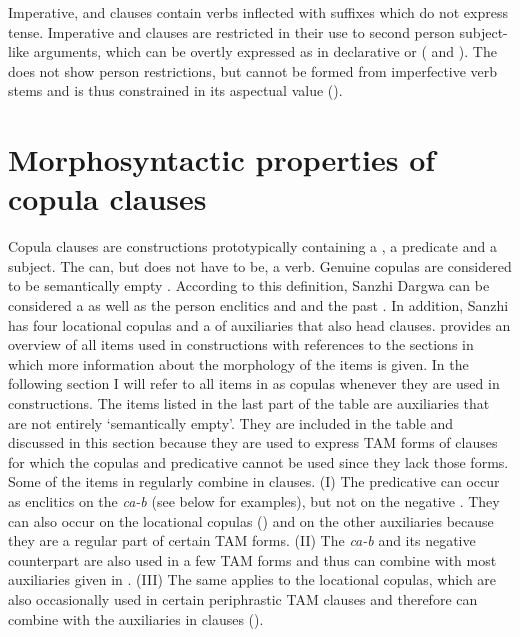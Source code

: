 Imperative,  and  clauses contain verbs inflected with suffixes which do not express tense. Imperative and  clauses are restricted in their use to second person subject-like arguments, which can be overtly expressed as in declarative or  ( and ). The  does not show person restrictions, but cannot be formed from imperfective verb stems and is thus constrained in its aspectual value ().




\section{Morphosyntactic properties of copula clauses}
\label{sec:copulaclauses}

Copula clauses are constructions prototypically containing a , a  predicate and a  subject. The  can, but does not have to be, a verb. Genuine copulas are considered to be semantically empty \citep[5]{Pustet2005}. According to this definition, Sanzhi Dargwa  can be considered a  as well as the person enclitics  and  and the past  . In addition, Sanzhi has four locational copulas and a  of auxiliaries that also head  clauses.  provides an overview of all items used in  constructions with references to the sections in which more information about the morphology of the items is given. In the following section I will refer to all items in  as copulas whenever they are used in  constructions. The items listed in the last part of the table are auxiliaries that are not entirely `semantically empty'. They are included in the table and discussed in this section because they are used to express TAM forms of  clauses for which the copulas and predicative  cannot be used since they lack those forms. Some of the items in  regularly combine in  clauses. (I) The predicative  can occur as enclitics on the  \textit{ca-b} (see below for examples), but not on the negative . They can also occur on the locational copulas () and on the other auxiliaries because they are a regular part of certain TAM forms. (II) The  \textit{ca-b} and its negative counterpart are also used in a few TAM forms and thus can combine with most auxiliaries given in  . (III) The same applies to the locational copulas, which are also occasionally used in certain periphrastic TAM clauses and therefore can combine with the auxiliaries in  clauses ().


